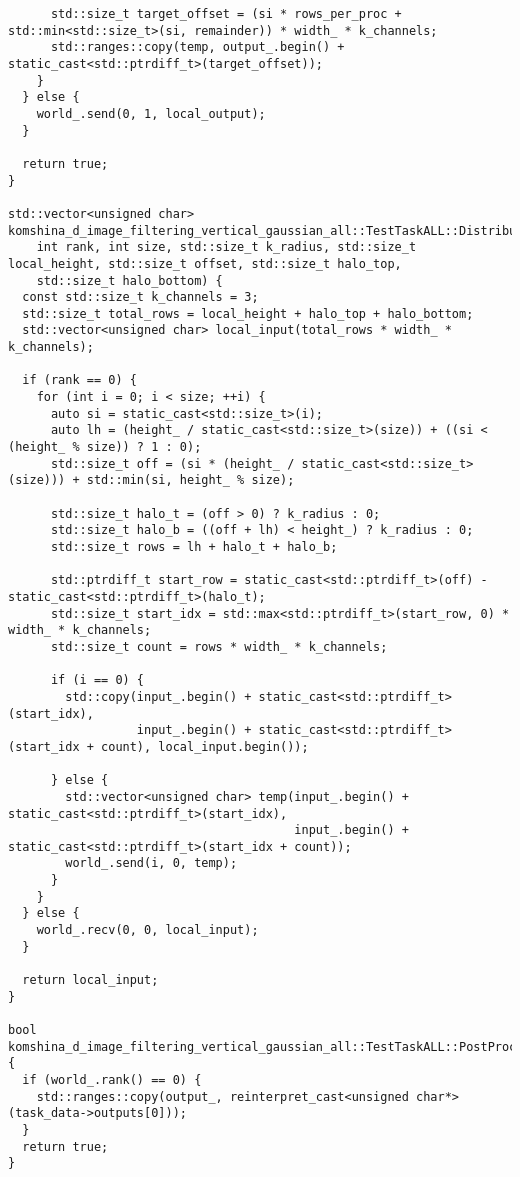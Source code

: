 \documentclass[12pt]{article}
\begin{document}
\begin{lstlisting}
      std::size_t target_offset = (si * rows_per_proc + std::min<std::size_t>(si, remainder)) * width_ * k_channels;
      std::ranges::copy(temp, output_.begin() + static_cast<std::ptrdiff_t>(target_offset));
    }
  } else {
    world_.send(0, 1, local_output);
  }

  return true;
}

std::vector<unsigned char> komshina_d_image_filtering_vertical_gaussian_all::TestTaskALL::DistributeInputToProcesses(
    int rank, int size, std::size_t k_radius, std::size_t local_height, std::size_t offset, std::size_t halo_top,
    std::size_t halo_bottom) {
  const std::size_t k_channels = 3;
  std::size_t total_rows = local_height + halo_top + halo_bottom;
  std::vector<unsigned char> local_input(total_rows * width_ * k_channels);

  if (rank == 0) {
    for (int i = 0; i < size; ++i) {
      auto si = static_cast<std::size_t>(i);
      auto lh = (height_ / static_cast<std::size_t>(size)) + ((si < (height_ % size)) ? 1 : 0);
      std::size_t off = (si * (height_ / static_cast<std::size_t>(size))) + std::min(si, height_ % size);

      std::size_t halo_t = (off > 0) ? k_radius : 0;
      std::size_t halo_b = ((off + lh) < height_) ? k_radius : 0;
      std::size_t rows = lh + halo_t + halo_b;

      std::ptrdiff_t start_row = static_cast<std::ptrdiff_t>(off) - static_cast<std::ptrdiff_t>(halo_t);
      std::size_t start_idx = std::max<std::ptrdiff_t>(start_row, 0) * width_ * k_channels;
      std::size_t count = rows * width_ * k_channels;

      if (i == 0) {
        std::copy(input_.begin() + static_cast<std::ptrdiff_t>(start_idx),
                  input_.begin() + static_cast<std::ptrdiff_t>(start_idx + count), local_input.begin());

      } else {
        std::vector<unsigned char> temp(input_.begin() + static_cast<std::ptrdiff_t>(start_idx),
                                        input_.begin() + static_cast<std::ptrdiff_t>(start_idx + count));
        world_.send(i, 0, temp);
      }
    }
  } else {
    world_.recv(0, 0, local_input);
  }

  return local_input;
}

bool komshina_d_image_filtering_vertical_gaussian_all::TestTaskALL::PostProcessingImpl() {
  if (world_.rank() == 0) {
    std::ranges::copy(output_, reinterpret_cast<unsigned char*>(task_data->outputs[0]));
  }
  return true;
}

\end{lstlisting}
\end{document}
